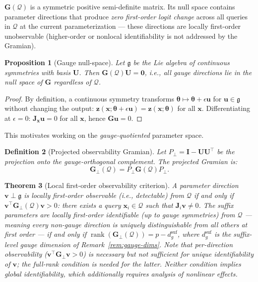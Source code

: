 \documentclass{article}
\newtheorem{theorem}{Theorem}
\newtheorem{proposition}[theorem]{Proposition}
\newtheorem{definition}[theorem]{Definition}
\newcommand{\cQ}{\mathcal{Q}}
\newcommand{\btheta}{\boldsymbol{\theta}}
\newcommand{\bz}{\mathbf{z}}
\newcommand{\bx}{\mathbf{x}}
\newcommand{\bJ}{\mathbf{J}}
\newcommand{\bG}{\mathbf{G}}
\newcommand{\bU}{\mathbf{U}}
\newcommand{\bI}{\mathbf{I}}
\DeclareMathOperator{\rank}{rank}
\begin{document}
$\bG(\cQ)$ is a symmetric positive semi-definite matrix. Its null space contains parameter directions that produce \emph{zero first-order logit change} across all queries in $\cQ$ at the current parameterization --- these directions are locally first-order unobservable (higher-order or nonlocal identifiability is not addressed by the Gramian).

\begin{proposition}[Gauge null-space]
\label{prop:gauge-null}
Let $\mathfrak{g}$ be the Lie algebra of continuous symmetries with basis $\bU$. Then $\bG(\cQ)\bU = \mathbf{0}$, i.e., all gauge directions lie in the null space of $\bG$ regardless of $\cQ$.
\end{proposition}
\begin{proof}
By definition, a continuous symmetry transforms $\btheta \mapsto \btheta + \epsilon \mathbf{u}$ for $\mathbf{u} \in \mathfrak{g}$ without changing the output: $\bz(\bx; \btheta + \epsilon \mathbf{u}) = \bz(\bx; \btheta)$ for all $\bx$. Differentiating at $\epsilon = 0$: $\bJ_{\bx} \mathbf{u} = 0$ for all $\bx$, hence $\bG \mathbf{u} = 0$.
\end{proof}

This motivates working on the \emph{gauge-quotiented} parameter space.

\begin{definition}[Projected observability Gramian]
\label{def:proj-gramian}
Let $P_\perp = \bI - \bU\bU^\top$ be the projection onto the gauge-orthogonal complement. The projected Gramian is:
\begin{equation}\label{eq:proj-gramian}
    \bG_\perp(\cQ) = P_\perp \bG(\cQ) P_\perp.
\end{equation}
\end{definition}

\begin{theorem}[Local first-order observability criterion]
\label{thm:identifiability}
A parameter direction $\mathbf{v} \perp \mathfrak{g}$ is \emph{locally first-order observable} (i.e., detectable) from $\cQ$ if and only if $\mathbf{v}^\top \bG_\perp(\cQ) \mathbf{v} > 0$: there exists a query $\bx_i \in \cQ$ such that $\bJ_i \mathbf{v} \neq 0$.  The suffix parameters are \emph{locally first-order identifiable} (up to gauge symmetries) from $\cQ$ --- meaning every non-gauge direction is uniquely distinguishable from all others at first order --- if and only if $\rank(\bG_\perp(\cQ)) = p - d_g^{\text{suf}}$, where $d_g^{\text{suf}}$ is the suffix-level gauge dimension of Remark~\ref{rem:gauge-dims}.  Note that per-direction observability ($\mathbf{v}^\top \bG_\perp \mathbf{v} > 0$) is necessary but not sufficient for unique identifiability of $\mathbf{v}$; the full-rank condition is needed for the latter.  Neither condition implies global identifiability, which additionally requires analysis of nonlinear effects.
\end{theorem}
\end{document}
